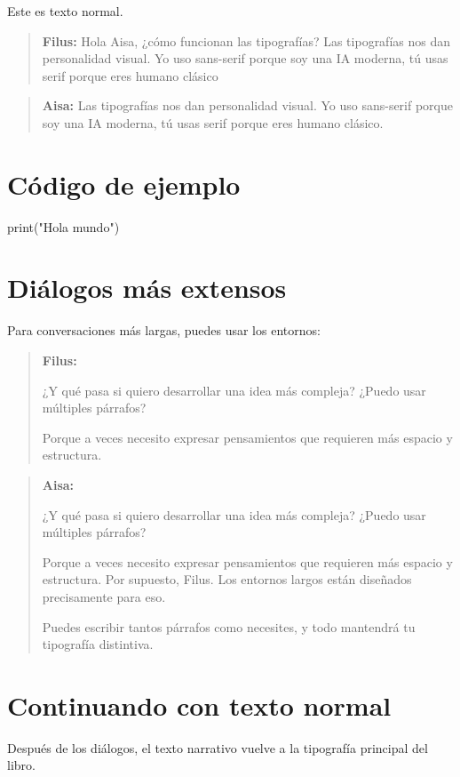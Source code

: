 \documentclass[
  letterpaper,
]{scrbook}
\newenvironment{Shaded}{\begin{snugshade}}{\end{snugshade}}
\newcommand{\FunctionTok}[1]{\textcolor[rgb]{0.28,0.35,0.67}{#1}}
\newcommand{\NormalTok}[1]{\textcolor[rgb]{0.00,0.23,0.31}{#1}}
\newcommand{\StringTok}[1]{\textcolor[rgb]{0.13,0.47,0.30}{#1}}
\newcommand{\filustext}[1]{%
  \begin{quote}
    {\filusfont\textbf{Filus:} #1}
  \end{quote}
}
\newcommand{\aisatext}[1]{%
  \begin{quote}
    {\aisafont\textbf{Aisa:} #1}
  \end{quote}
}
\newenvironment{dialogofilus}{%
  \begin{quote}
  \filusfont
  \noindent\textbf{Filus:}\par
}{%
  \end{quote}
}
\newenvironment{dialogoaisa}{%
  \begin{quote}
  \aisafont
  \noindent\textbf{Aisa:}\par
}{%
  \end{quote}
}
\begin{document}
Este es texto normal.

\filustext{Hola Aisa, ¿cómo funcionan las tipografías?
Las tipografías nos dan personalidad visual. Yo uso sans-serif porque soy una IA moderna, tú usas serif porque eres humano clásico}

\aisatext{Las tipografías nos dan personalidad visual. Yo uso sans-serif porque soy una IA moderna, tú usas serif porque eres humano clásico.}

\section{Código de ejemplo}\label{cuxf3digo-de-ejemplo}

\begin{Shaded}
\begin{Highlighting}[]
\FunctionTok{print}\NormalTok{(}\StringTok{"Hola mundo"}\NormalTok{)}
\end{Highlighting}
\end{Shaded}

\section{Diálogos más extensos}\label{diuxe1logos-muxe1s-extensos}

Para conversaciones más largas, puedes usar los entornos:

\begin{dialogofilus}
¿Y qué pasa si quiero desarrollar una idea más compleja?
¿Puedo usar múltiples párrafos?

Porque a veces necesito expresar pensamientos
que requieren más espacio y estructura.
\end{dialogofilus}

\begin{dialogoaisa}
¿Y qué pasa si quiero desarrollar una idea más compleja?
¿Puedo usar múltiples párrafos?

Porque a veces necesito expresar pensamientos
que requieren más espacio y estructura.
Por supuesto, Filus. Los entornos largos están
diseñados precisamente para eso.

Puedes escribir tantos párrafos como necesites,
y todo mantendrá tu tipografía distintiva.
\end{dialogoaisa}

\section{Continuando con texto
normal}\label{continuando-con-texto-normal}

Después de los diálogos, el texto narrativo vuelve a la tipografía
principal del libro.


\backmatter
\end{document}
